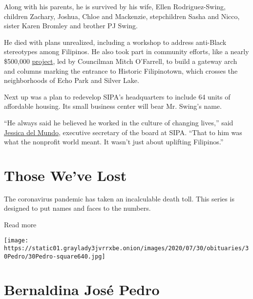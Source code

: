 Along with his parents, he is survived by his wife, Ellen
Rodriguez-Swing, children Zachary, Joshua, Chloe and Mackenzie,
stepchildren Sasha and Nicco, sister Karen Bromley and brother PJ Swing.

He died with plans unrealized, including a workshop to address
anti-Black stereotypes among Filipinos. He also took part in community
efforts, like a nearly \$500,000
\href{https://www.theeastsiderla.com/neighborhoods/historic_filipinotown/plans-unveiled-for-452-000-gateway-to-historic-filipinotown/article_096736f6-ad28-11ea-8a45-d34c6d8d6822.html\#:~:text=\%22Historic\%20Filipinotown\%20will\%20have\%20a,\%2C\%22\%20O'Farrell\%20said.\&text=Designed\%20by\%20Filipino\%20artist\%20Eliseo,Gabay\%3A\%20Our\%20Guiding\%20Star.\%E2\%80\%9D}{project},
led by Councilman Mitch O'Farrell, to build a gateway arch and columns
marking the entrance to Historic Filipinotown, which crosses the
neighborhoods of Echo Park and Silver Lake.

Next up was a plan to redevelop SIPA's headquarters to include 64 units
of affordable housing. Its small business center will bear Mr. Swing's
name.

``He always said he believed he worked in the culture of changing
lives,'' said \href{https://sipacares.org/about/board/}{Jessica del
Mundo}, executive secretary of the board at SIPA. ``That to him was what
the nonprofit world meant. It wasn't just about uplifting Filipinos.''

\href{https://www.nytimes3xbfgragh.onion/interactive/2020/obituaries/people-died-coronavirus-obituaries.html?action=click\&pgtype=Article\&state=default\&region=BELOW_MAIN_CONTENT\&context=covid_obits_promo}{}

\hypertarget{those-weve-lost}{%
\section{Those We've Lost}\label{those-weve-lost}}

The coronavirus pandemic has taken an incalculable death toll. This
series is designed to put names and faces to the numbers.

Read more

\texttt{[image: https://static01.graylady3jvrrxbe.onion/images/2020/07/30/obituaries/30Pedro/30Pedro-square640.jpg]}

\hypertarget{bernaldina-josuxe9-pedro}{%
\section{Bernaldina José Pedro}\label{bernaldina-josuxe9-pedro}}

